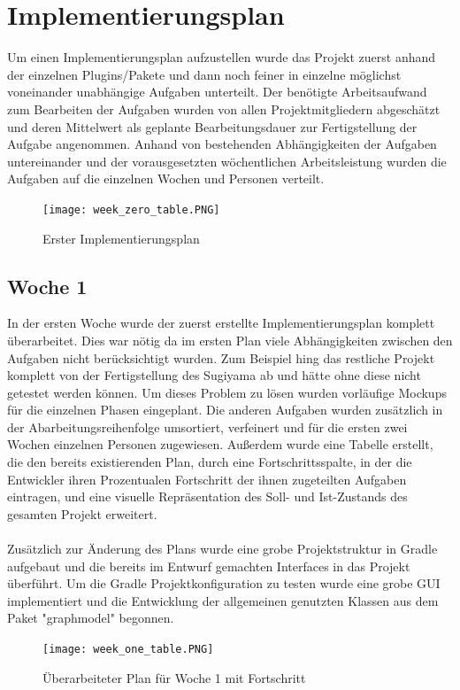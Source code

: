 \chapter{Implementierungsplan}
\label{ch:implplan}
Um einen Implementierungsplan aufzustellen wurde das Projekt zuerst anhand der einzelnen Plugins/Pakete und dann noch feiner in einzelne möglichst voneinander unabhängige Aufgaben unterteilt. Der benötigte Arbeitsaufwand zum Bearbeiten der Aufgaben wurden von allen Projektmitgliedern abgeschätzt und deren Mittelwert als geplante Bearbeitungsdauer zur Fertigstellung der Aufgabe angenommen. Anhand von bestehenden Abhängigkeiten der Aufgaben untereinander und der vorausgesetzten wöchentlichen Arbeitsleistung wurden die Aufgaben auf die einzelnen Wochen und Personen verteilt. \\
\begin{figure}[!htbp]
	\centering
	\texttt{[image: week\_zero\_table.PNG]}
	\caption{Erster Implementierungsplan}
	\label{fig:week_zero_table}
\end{figure}
\newpage
\section{Woche 1}
In der ersten Woche wurde der zuerst erstellte Implementierungsplan komplett überarbeitet. Dies war nötig da im ersten Plan viele Abhängigkeiten zwischen den Aufgaben nicht berücksichtigt wurden. Zum Beispiel hing das restliche Projekt komplett von der Fertigstellung des Sugiyama ab und hätte ohne diese nicht getestet werden können. Um dieses Problem zu lösen wurden vorläufige Mockups für die einzelnen Phasen eingeplant. Die anderen Aufgaben wurden zusätzlich in der Abarbeitungsreihenfolge umsortiert, verfeinert und für die ersten zwei Wochen einzelnen Personen zugewiesen. Außerdem wurde eine Tabelle erstellt, die den bereits existierenden Plan, durch eine Fortschrittsspalte, in der die Entwickler ihren Prozentualen Fortschritt der ihnen zugeteilten Aufgaben eintragen, und eine visuelle Repräsentation des Soll- und Ist-Zustands des gesamten Projekt erweitert.\\
\\
Zusätzlich zur Änderung des Plans wurde eine grobe Projektstruktur in Gradle aufgebaut und die bereits im Entwurf gemachten Interfaces in das Projekt überführt. Um die Gradle Projektkonfiguration zu testen wurde eine grobe GUI implementiert und die Entwicklung der allgemeinen genutzten Klassen aus dem Paket "graphmodel"  begonnen.

\begin{figure}[!htbp]
	\centering
	\texttt{[image: week\_one\_table.PNG]}
	\caption{Überarbeiteter Plan für Woche 1 mit Fortschritt}
	\label{fig:week_one_table}
\end{figure}

